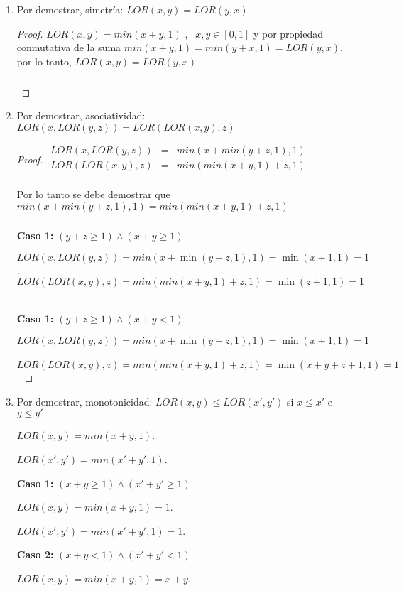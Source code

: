 \documentclass[letterpaper,spanish,11pt]{article}
\begin{document}
\begin{enumerate}
\item Por demostrar, simetr\'{i}a: $LOR(x,y)=LOR(y,x)$
\begin{proof}

$LOR(x,y)=min(x+y,1)$ , $\ \ x,y \in [0,1]$ y por propiedad conmutativa de la suma $min(x+y,1) = min(y+x,1)=LOR(y,x)$, por lo tanto, $LOR(x,y)=LOR(y,x)$

\[\qedhere\]
\end{proof}


\item Por demostrar, asociatividad: $LOR(x,LOR(y,z))=LOR(LOR(x,y),z)$

\begin{proof}
$\begin{array}{lll}
LOR(x,LOR(y,z)) &= &min(x+min(y+z,1),1)\\
LOR(LOR(x,y),z) &= & min(min(x+y,1)+z,1) \\ 
\end{array}$

Por lo tanto se debe demostrar que $min(x+min(y+z,1),1)=min(min(x+y,1)+z,1)$
\[\qedhere\]

\textbf{Caso 1:}  $(y+z \geq 1) \wedge (x+y \geq 1)$.

$LOR(x,LOR(y,z)) = min (x+ \min(y+z,1),1)= \min(x+1,1)=1$.\\
$LOR(LOR(x,y),z) =  min(min(x+y,1)+z,1)=\min(z+1,1)=1$.

\textbf{Caso 1:}  $(y+z \geq 1) \wedge (x+y < 1)$.

$LOR(x,LOR(y,z)) = min (x+ \min(y+z,1),1)= \min(x+1,1)=1$.\\
$LOR(LOR(x,y),z) =  min(min(x+y,1)+z,1)=\min(x+y+z+1,1)=1$.


\end{proof}


\item Por demostrar, monotonicidad: $LOR(x,y) \leq LOR(x',y')$ si $x\leq x'$ e $y\leq y'$

$LOR(x,y) = min (x+y,1)$.

$LOR(x',y') = min (x'+y',1)$.

\textbf{Caso 1:}  $(x + y \geq 1) \wedge (x'+y' \geq 1)$.

$LOR(x,y) = min (x+y,1)=1$.

$LOR(x',y') = min (x'+y',1)=1$.


\textbf{Caso 2:}  $(x + y < 1) \wedge (x'+y' < 1)$.

$LOR(x,y) = min (x+y,1)=x+y$.


\end{enumerate}
\end{document}
